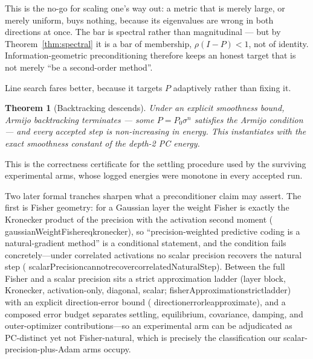 \documentclass[11pt]{article}
\newtheorem{theorem}{Theorem}[section]
\newcommand{\leanname}[1]{{\scriptsize\ttfamily
  \def\_{\textunderscore\allowbreak}#1}}
\begin{document}
This is the no-go for scaling one's way out: a metric that is merely large, or merely
uniform, buys nothing, because its eigenvalues are wrong in both directions at once. The
bar is spectral rather than magnitudinal --- but by Theorem~\ref{thm:spectral} it is a bar
of membership, $\rho(I-P)<1$, not of identity. Information-geometric preconditioning
therefore keeps an honest target that is not merely ``be a second-order method''.

Line search fares better, because it targets $P$ adaptively rather than fixing it.

\begin{theorem}[Backtracking descends]\label{thm:armijo}
Under an explicit smoothness bound, Armijo backtracking terminates --- some
$P = P_0\sigma^n$ satisfies the Armijo condition --- and every accepted step is
non-increasing in energy. This instantiates with the exact smoothness constant of the
depth-2 PC energy.
\end{theorem}

This is the correctness certificate for the settling procedure used by the surviving
experimental arms, whose logged energies were monotone in every accepted run.

Two later formal tranches sharpen what a preconditioner claim may assert. The first is
Fisher geometry: for a Gaussian layer the weight Fisher is exactly the Kronecker product
of the precision with the activation second moment
(\leanname{gaussianWeightFisher\_eq\_kronecker}), so ``precision-weighted predictive
coding is a natural-gradient method'' is a conditional statement, and the condition
fails concretely---under correlated activations no scalar precision recovers the natural
step (\leanname{scalarPrecision\_cannot\_recover\_correlatedNaturalStep}). Between the
full Fisher and a scalar precision sits a strict approximation ladder (layer block,
Kronecker, activation-only, diagonal, scalar;
\leanname{fisherApproximation\_strict\_ladder}) with an explicit direction-error bound
(\leanname{direction\_error\_le\_approximate}), and a composed error budget separates
settling, equilibrium, covariance, damping, and outer-optimizer contributions---so an
experimental arm can be adjudicated as PC-distinct yet not Fisher-natural, which is
precisely the classification our scalar-precision-plus-Adam arms occupy.
\end{document}
